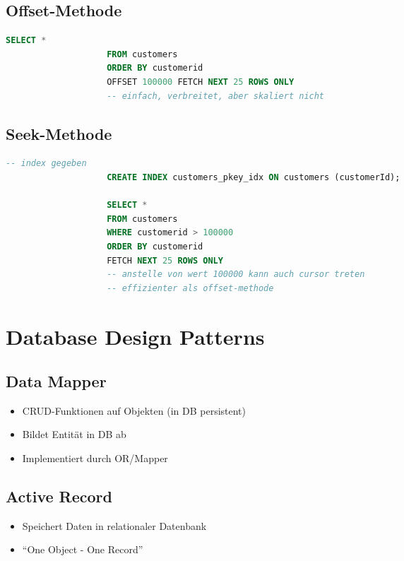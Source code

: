 \documentclass[a4paper, landscape, 8pt]{scrartcl}
\begin{document}
\begin{multicols*}{4}
        \subsection{Offset-Methode}
        \begin{lstlisting}[language=sql]
                    SELECT *
                    FROM customers
                    ORDER BY customerid
                    OFFSET 100000 FETCH NEXT 25 ROWS ONLY
                    -- einfach, verbreitet, aber skaliert nicht
        \end{lstlisting}

        \subsection{Seek-Methode}
        \begin{lstlisting}[language=sql]
                    -- index gegeben
                    CREATE INDEX customers_pkey_idx ON customers (customerId);

                    SELECT *
                    FROM customers
                    WHERE customerid > 100000
                    ORDER BY customerid
                    FETCH NEXT 25 ROWS ONLY
                    -- anstelle von wert 100000 kann auch cursor treten
                    -- effizienter als offset-methode
        \end{lstlisting}



        \section{Database Design Patterns}
        \subsection{Data Mapper}
        \begin{itemize}
            \item CRUD-Funktionen auf Objekten (in DB persistent)
            \item Bildet Entität in DB ab
            \item Implementiert durch OR/Mapper
        \end{itemize}

        \subsection{Active Record}
        \begin{itemize}
            \item Speichert Daten in relationaler Datenbank
            \item \enquote{One Object - One Record}
        \end{itemize}


\end{multicols*}
\end{document}
